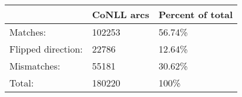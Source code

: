 	\begin{tabular}{|l|l|l|}
		\hline
		 & CoNLL arcs & Percent of total \\ 
		\hline
		Matches: & 102253 & 56.74\%\\ 
		\hline
		Flipped direction: & 22786 & 12.64\%\\ 
		\hline
		Mismatches: & 55181 & 30.62\%\\ 
		\hline
		Total: & 180220 & 100\% \\ 
		\hline
	\end{tabular}
